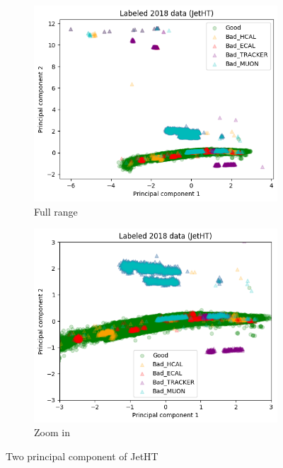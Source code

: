 \begin{figure}[h!]
\begin{subfigure}[b]{0.49\linewidth}
        \includegraphics[width=\linewidth]{images/reco/2018/JetHT_subsystem_label.png}
        \caption{Full range}
    \end{subfigure}
    \begin{subfigure}[b]{0.49\linewidth}
        \includegraphics[width=\linewidth]{images/reco/2018/JetHT_subsystem_label_short_range.png}
        \caption{Zoom in}
    \end{subfigure}
    \caption{Two principal component of JetHT}
\label{fig:2018_JetHT_subsystem_label}
\end{figure}

